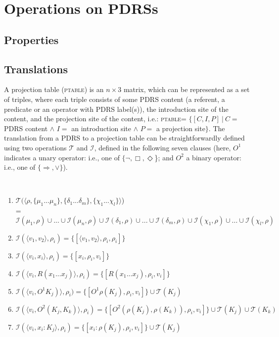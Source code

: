 \section{Operations on PDRSs}\label{sec:operations}

\subsection{Properties}



\subsection{Translations}\label{sec:translations}

A projection table (\textsc{ptable}) is an $n\times3$ matrix, which can be
represented as a set of triples, where each triple consists of some PDRS
content (a referent, a predicate or an operator with PDRS label(s)), the
introduction site of the content, and the projection site of the content,
i.e.: \textsc{ptable}= $\{[C,I,P]~|~C=$ PDRS content $\wedge$ $I=$ an
introduction site $\wedge$ $P=$ a projection site$\}$. The translation from
a PDRS to a projection table can be straightforwardly defined using two
operations $\mathcal{T}$ and $\mathcal{I}$, defined in the following seven
clauses (here, $O^1$ indicates a unary operator: i.e., one of $\{\neg, \Box,
\Diamond$\}; and $O^2$ a binary operator: i.e., one of $\{\Rightarrow,
\vee\}$).

\begin{definition}~\\\vspace{-12pt}
\begin{enumerate}
  \item $\mathcal{T}(\langle\rho,\{\mu_1...\mu_n\},
    \{\delta_1...\delta_m\}, \{\chi_1...\chi_l\}\rangle$)\\
    = $\mathcal{I}(\mu_1,\rho)\cup...\cup \mathcal{I}(\mu_n,\rho)\cup
      \mathcal{I}(\delta_1,\rho)\cup...\cup \mathcal{I}(\delta_m,\rho)\cup
      \mathcal{I}(\chi_1,\rho)\cup...\cup \mathcal{I}(\chi_l,\rho)$
  \item $\mathcal{I}(\langle v_1, v_2 \rangle,\rho_i)
    = \{[\langle v_1, v_2 \rangle,\rho_i,\rho_i]\}$
  \item $\mathcal{I}(\langle v_i, x_i \rangle,\rho_i)
    = \{[x_i,\rho_i,v_i]\}$
  \item $\mathcal{I}(\langle v_i, R(x_1...x_j) \rangle,\rho_i)
    = \{[R(x_1...x_j),\rho_i,v_i]\}$
  \item $\mathcal{I}(\langle v_i, O^1 K_j) \rangle,\rho_i)
    = \{[O^1 \rho(K_j),\rho_i,v_i]\} \cup \mathcal{T}(K_j)$
  \item $\mathcal{I}(\langle v_i,  O^2(K_j, K_k) \rangle,\rho_i)
    = \{[O^2(\rho(K_j),\rho(K_k)),\rho_i,v_i]\} \cup \mathcal{T}(K_j)
      \cup \mathcal{T}(K_k)$
  \item $\mathcal{I}(\langle v_i, x_i:K_j \rangle,\rho_i)
    = \{[x_i:\rho(K_j),\rho_i,v_i]\} \cup \mathcal{T}(K_j)$
\end{enumerate}
\end{definition}

